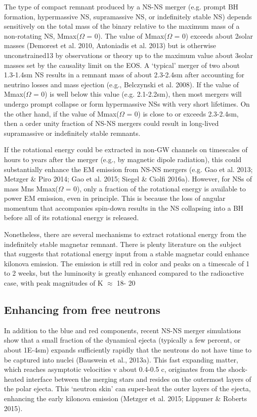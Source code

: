 The type of compact remnant produced by a NS-NS merger (e.g. prompt BH formation, hypermassive NS, supramassive NS, or indefinitely stable NS) depends sensitively on the total mass of the binary relative to the maximum mass of a non-rotating NS, Mmax($\Omega$ = 0). The value of Mmax($\Omega$ = 0) exceeds about 2solar masses (Demorest et al. 2010, Antoniadis et al. 2013) but is otherwise unconstrained13 by observations or theory up to the maximum value about 3solar masses set by the causality limit on the EOS. A `typical' merger of two about 1.3-1.4sm NS results in a remnant mass of about 2.3-2.4sm after accounting for neutrino losses and mass ejection (e.g., Belczynski et al. 2008). If the value of Mmax($\Omega$ = 0) is well below this value (e.g. 2.1-2.2sm), then most mergers will undergo prompt collapse or form hypermassive NSs with very short lifetimes. On the other hand, if the value of Mmax($\Omega$ = 0) is close to or exceeds 2.3-2.4sm, then a order unity fraction of NS-NS mergers could result in long-lived supramassive or indefinitely stable remnants.

If the rotational energy could be extracted in non-GW channels on timescales of hours to years after the merger (e.g., by magnetic dipole radiation), this could substantially enhance the EM emission from NS-NS mergers (e.g. Gao et al. 2013; Metzger \& Piro 2014; Gao et al. 2015; Siegel \& Ciolfi 2016a). However, for NSs of mass Mns   Mmax($\Omega$ = 0), only a fraction of the rotational energy is available to power EM emission, even in principle. This is because the loss of angular momentum that accompanies spin-down results in the NS collapsing into a BH before all of its rotational energy is released.

Nonetheless, there are several mechanisms to extract rotational energy from the indefinitely stable magnetar remnant.
There is plenty literature on the subject that suggests that rotational energy input from a stable magnetar could enhance kilonova emission. The emission is still red in color and peaks on a timescale of 1 to 2 weeks, but the luminosity is greatly enhanced compared to the radioactive case, with peak magnitudes of K $\approx$ 18- 20

\subsection{Enhancing from free neutrons}

In addition to the blue and red components, recent NS-NS merger simulations show that a small fraction of the dynamical ejecta (typically a few percent, or about 1E-4sm) expands sufficiently rapidly that the neutrons do not have time to be captured into nuclei (Bauswein et al., 2013a). This fast expanding matter, which reaches asymptotic velocities v about 0.4-0.5 c, originates from the shock- heated interface between the merging stars and resides on the outermost layers of the polar ejecta. This `neutron skin' can super-heat the outer layers of the ejecta, enhancing the early kilonova emission (Metzger et al. 2015; Lippuner \& Roberts 2015).

